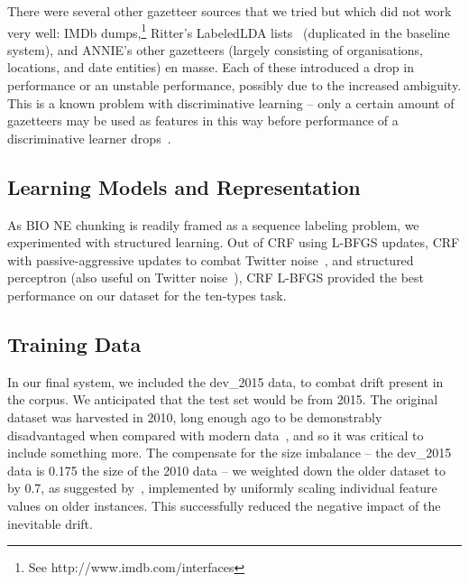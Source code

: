 \documentclass[11pt|a4paper]{article}
\begin{document}
There were several other gazetteer sources that we tried but which did not work very well: IMDb dumps,\footnote{See http://www.imdb.com/interfaces} Ritter's LabeledLDA lists~\cite{Ritter2011} (duplicated in the baseline system), and ANNIE's other gazetteers (largely consisting of organisations, locations, and date entities) en masse.
Each of these introduced a drop in performance or an unstable performance, possibly due to the increased ambiguity.
This is a known problem with discriminative learning -- only a certain amount of gazetteers may be used as features in this way before performance of a discriminative learner drops~\cite{smith-osborne:2006:CoNLL-X}.

\subsection{Learning Models and Representation}
As BIO NE chunking is readily framed as a sequence labeling problem, we experimented with structured learning.
Out of CRF using L-BFGS updates, CRF with passive-aggressive updates to combat Twitter noise~\cite{derczynski2014passive}, and structured perceptron (also useful on Twitter noise~\cite{johannsen2014more}), CRF L-BFGS provided the best performance on our dataset for the ten-types task.

\subsection{Training Data}
In our final system, we included the dev\_2015 data, to combat drift present in the corpus.
We anticipated that the test set would be from 2015.
The original dataset was harvested in 2010, long enough ago to be demonstrably disadvantaged when compared with modern data~\cite{fromreide2014crowdsourcing}, and so it was critical to include something more.
The compensate for the size imbalance -- the dev\_2015 data is 0.175 the size of the 2010 data -- we weighted down the older dataset to by 0.7, as suggested by~\cite{cherry2015unreasonable}, implemented by uniformly scaling individual feature values on older instances.
This successfully reduced the negative impact of the inevitable drift.
\end{document}
